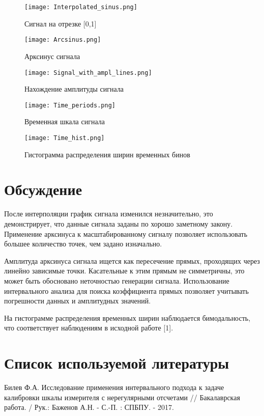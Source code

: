 \documentclass[12pt,a4paper]{article}
\begin{document}
\begin{figure}[H]
    \centering
    \texttt{[image: Interpolated\_sinus.png]}
    \caption{Сигнал на отрезке [0,1]}
\end{figure}

\begin{figure}[H]
    \centering
    \texttt{[image: Arcsinus.png]}
    \caption{Арксинус сигнала}
\end{figure}

\begin{figure}[H]
    \centering
    \texttt{[image: Signal\_with\_ampl\_lines.png]}
    \caption{Нахождение амплитуды сигнала}
\end{figure}

\begin{figure}[H]
    \centering
    \texttt{[image: Time\_periods.png]}
    \caption{Временная шкала сигнала}
\end{figure}

\begin{figure}[H]
    \centering
    \texttt{[image: Time\_hist.png]}
    \caption{Гистограмма распределения ширин временных бинов}
\end{figure}

\section{Обсуждение}
После интерполяции график сигнала изменился незначительно, это демонстрирует, что данные сигнала заданы по хорошо заметному закону. Применение арксинуса к масштабированному сигналу позволяет использовать большее количество точек, чем задано изначально.

Амплитуда арксинуса сигнала ищется как пересечение прямых, проходящих через
линейно зависимые точки. Касательные к этим прямым не симметричны, это может быть обосновано неточностью генерации сигнала. Использование интервального анализа для поиска коэффициента прямых позволяет учитывать погрешности данных и амплитудных значений.

На гистограмме распределения временных ширин наблюдается бимодальность, что соответствует наблюдениям в исходной работе [1].

\section{Список используемой литературы}
\begin{thebibliography}{1}
Билев Ф.А. Исследование применения интервального подхода к задаче калибровки шкалы измерителя с нерегулярными отсчетами // Бакалаврская работа. / Рук.: Баженов А.Н. - С.-П. : СПБПУ. - 2017.
\end{thebibliography}
\end{document}
